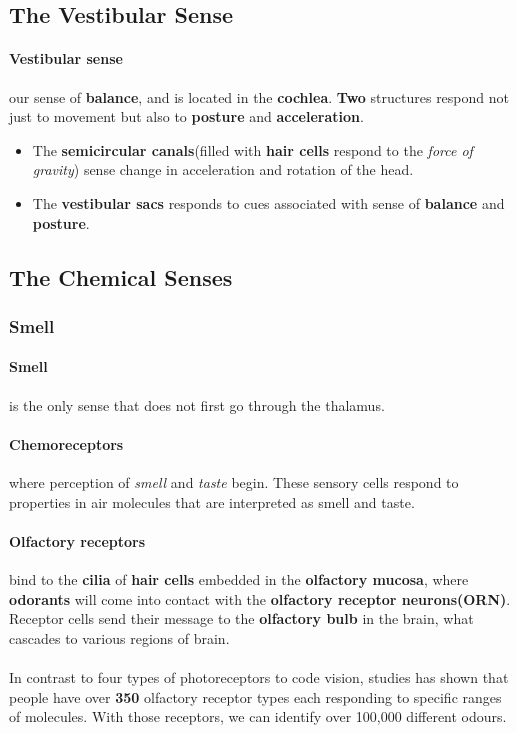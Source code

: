 \documentclass{article}
\begin{document}
	\subsection{The Vestibular Sense}
	\paragraph{Vestibular sense} our sense of \textbf{balance}, and is located in the \textbf{cochlea}.
	\newline \textbf{Two} structures respond not just to movement but also to \textbf{posture} and \textbf{acceleration}. 
	\begin{itemize}
		\item The \textbf{semicircular canals}(filled with \textbf{hair cells} respond to the \emph{force of gravity}) sense change in acceleration and rotation of the head.
		\item The \textbf{vestibular sacs} responds to cues associated with sense of \textbf{balance} and \textbf{posture}.
	\end{itemize}
	\subsection{The Chemical Senses}
	\subsubsection{Smell}
	\paragraph{Smell} is the only sense that does not first go through the thalamus.
	\paragraph{Chemoreceptors} where perception of \emph{smell} and \emph{taste} begin. These sensory cells respond to properties in air molecules that are interpreted as smell and taste.
	\paragraph{Olfactory receptors} bind to the \textbf{cilia} of \textbf{hair cells} embedded in the \textbf{olfactory mucosa}, where \textbf{odorants} will come into contact with the \textbf{olfactory receptor neurons(ORN)}. Receptor cells send their message to the \textbf{olfactory bulb} in the brain, what cascades to various regions of brain.
	\paragraph{} In contrast to four types of photoreceptors to code vision, studies has shown that people have over \textbf{350} olfactory receptor types each responding to specific ranges of molecules. With those receptors, we can identify over 100,000 different odours.
\end{document}
